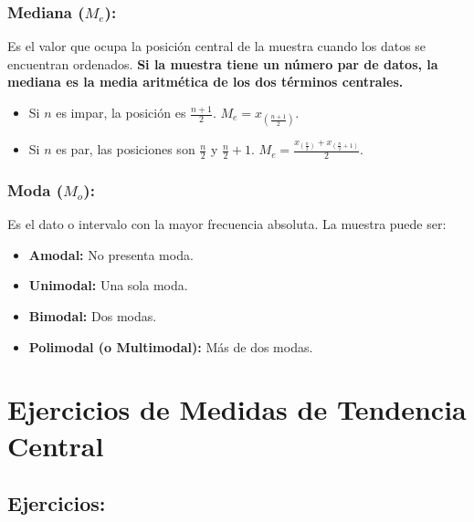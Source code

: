 \documentclass[12pt, letterpaper]{article}
\begin{document}
\subsubsection{\texorpdfstring{Mediana ($M_e$):}{Mediana (Me)}}
Es el valor que ocupa la posición central de la muestra cuando los datos se encuentran ordenados. \textbf{Si la muestra tiene un número par de datos, la mediana es la media aritmética de los dos términos centrales.}
\begin{itemize}
	\item Si $n$ es impar, la posición es $\frac{n+1}{2}$. $M_e = x_{(\frac{n+1}{2})}$.
	\item Si $n$ es par, las posiciones son $\frac{n}{2}$ y $\frac{n}{2}+1$. $M_e = \frac{x_{(\frac{n}{2})} + x_{(\frac{n}{2}+1)}}{2}$.
\end{itemize}

\subsubsection{\texorpdfstring{Moda ($M_o$):}{Moda (Mo)}}
Es el dato o intervalo con la mayor frecuencia absoluta. La muestra puede ser:
\begin{itemize}
	\item \textbf{Amodal:} No presenta moda.
	\item \textbf{Unimodal:} Una sola moda.
	\item \textbf{Bimodal:} Dos modas.
	\item \textbf{Polimodal (o Multimodal):} Más de dos modas.
\end{itemize}
\newpage

\section{Ejercicios de Medidas de Tendencia Central}
\subsection{Ejercicios:}
\end{document}
